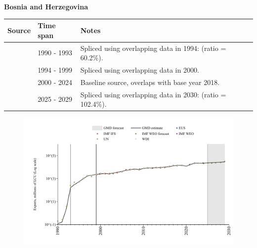\documentclass[12pt,a4paper,landscape]{article}
\begin{document}
\begin{adjustbox}{max totalsize={\paperwidth}{\paperheight},center}
\begin{minipage}[t][\textheight][t]{\textwidth}
\vspace*{0.5cm}
{}
\begin{center}
{\Large\bfseries Bosnia and Herzegovina}
\end{center}
\vspace{0.5cm}
\begin{table}[H]
\centering
\small
\begin{tabular}{|l|l|l|}
\hline
\textbf{Source} & \textbf{Time span} & \textbf{Notes} \\
\hline
\rowcolor{white}\cite{UN}& 1990 - 1993 &Spliced using overlapping data in 1994: (ratio = 60.2\%).\\
\rowcolor{lightgray}\cite{WDI}& 1994 - 1999 &Spliced using overlapping data in 2000.\\
\rowcolor{white}\cite{EUS}& 2000 - 2024 &Baseline source, overlaps with base year 2018.\\
\rowcolor{lightgray}\cite{IMF_WEO_forecast}& 2025 - 2029 &Spliced using overlapping data in 2030: (ratio = 102.4\%).\\
\hline
\end{tabular}
\end{table}
\begin{figure}[H]
\centering
\includegraphics[width=\textwidth,height=0.6\textheight,keepaspectratio]{graphs/BIH_exports.pdf}
\end{figure}
\end{minipage}
\end{adjustbox}
\end{document}
